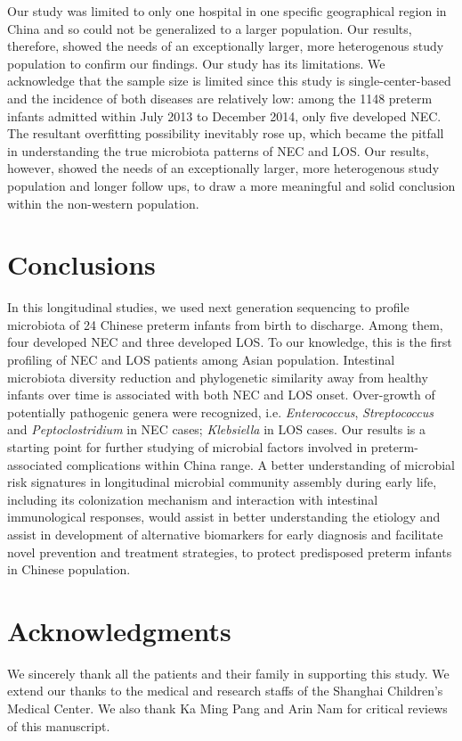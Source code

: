 \documentclass[fleqn,10pt]{wlpeerj} %
\begin{document}
\noindent
Our study was limited to only one hospital in one specific geographical region in China and so could not be generalized to a larger population. Our results, therefore, showed the needs of an exceptionally larger, more heterogenous study population to confirm our findings.
Our study has its limitations. We acknowledge that the sample size is limited since this study is single-center-based and the incidence of both diseases are relatively low: among the 1148 preterm infants admitted within July 2013 to December 2014, only five developed NEC. The resultant overfitting possibility inevitably rose up, which became the pitfall in understanding the true microbiota patterns of NEC and LOS. Our results, however, showed the needs of an exceptionally larger, more heterogenous study population and longer follow ups, to draw a more meaningful and solid conclusion within the non-western population.

\section*{Conclusions}
In this longitudinal studies, we used next generation sequencing to profile microbiota of 24 Chinese preterm infants from birth to discharge.  Among them, four developed NEC and three developed LOS.  To our knowledge, this is the first profiling of NEC and LOS patients among Asian population. Intestinal microbiota diversity reduction and phylogenetic similarity away from healthy infants over time is associated with both NEC and LOS onset. Over-growth  of potentially pathogenic genera were recognized, i.e. \textit{Enterococcus}, \textit{Streptococcus} and \textit{Peptoclostridium} in NEC cases; \textit{Klebsiella} in LOS cases. Our results is a starting point for further studying of microbial factors involved in preterm-associated complications within China range. A better understanding of microbial risk signatures in longitudinal microbial community assembly during early life, including its colonization mechanism and interaction with intestinal immunological responses, would assist in better understanding the etiology and assist in development of alternative biomarkers for early diagnosis and facilitate novel prevention and treatment strategies, to protect predisposed preterm infants in Chinese population.

\section*{Acknowledgments}
We sincerely thank all the patients and their family  in  supporting  this study. We extend our thanks to the medical and research staffs of the Shanghai Children’s Medical Center.  We also thank Ka Ming Pang and Arin Nam for critical reviews of this manuscript.









\end{document}
